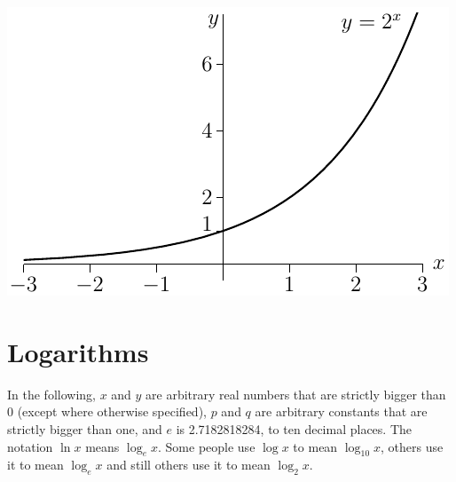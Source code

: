 \begin{itemize}
\begin{center}
\includegraphics{expGraph2.pdf}
\end{center}


\end{itemize}


\section{Logarithms}\label{sec logs}

In the following, $x$ and $y$ are arbitrary real numbers that 
are strictly bigger than 0 (except where otherwise specified), 
$p$ and $q$ are arbitrary constants that are strictly bigger 
than one, and $e$ is 2.7182818284, to ten decimal places.
The notation $\ln x$ means $\log_e x$. Some people use $\log x$
to mean $\log_{10} x$, others use it to mean $\log_e x$ and still
others use it to mean $\log_2 x$.

